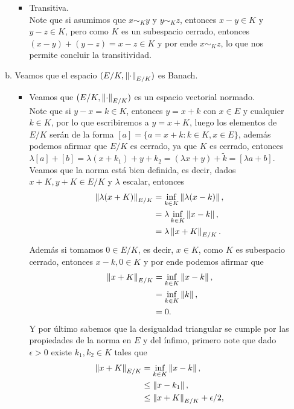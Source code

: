 \begin{homeworkProblem}
\begin{solution}
\begin{enumerate}[(i)]
\begin{enumerate}[(a)]
\begin{itemize}
            \item Transitiva.\\
              Note que si asumimos que $x\sim_{K}y$ y $y\sim_{K}z$, entonces $x-y\in K$ y $y-z\in K$, pero como $K$ es un subespacio cerrado, entonces $(x-y)+(y-z)=x-z\in K$ y por ende $x\sim_{K}z$, lo que nos permite concluir la transitividad.
          \end{itemize}
        \item Veamos que el espacio $(E/K,\left\|\cdot\right\|_{E/K})$ es Banach.
          \begin{itemize}
            \item Veamos que $(E/K,\left\|\cdot\right\|_{E/K})$ es un espacio vectorial normado.\\
              Note que si $y-x=k\in K$, entonces $y=x+k$ con $x\in E$ y cualquier $k\in K$, por lo que escribiremos a $y=x+K$, luego los elementos de $E/K$ serán de la forma $[a]=\{a=x+k:k\in K, x\in E\}$, además podemos afirmar que $E/K$ es cerrado, ya que $K$ es cerrado, entonces $\lambda[a]+[b]=\lambda (x+k_1)+y+k_2=(\lambda x+y)+\tilde{k}=[\lambda a+b]$. 
              Veamos que la norma está bien definida, es decir, dados $x+K,y+K\in E/K$ y $\lambda$ escalar, entonces
              \begin{align*}
                \left\|\lambda(x+K)\right\|_{E/K}&=\inf_{k\in K}\left\|\lambda(x-k)\right\|,\\
                &=\lambda\inf_{k\in K}\left\|x-k\right\|,\\
                &=\lambda \left\|x+K\right\|_{E/K}.
              \end{align*}
              Además si tomamos $0\in E/K$, es decir, $x\in K$, como $K$ es subespacio cerrado, entonces $x-k,0\in K$ y por ende podemos afirmar que
              \begin{align*}
                \left\|x+K\right\|_{E/K}&=\inf_{k\in K}\left\|x-k\right\|,\\
                &=\inf_{k\in K}\left\|k\right\|,\\
                &= 0.
              \end{align*}
              Y por último sabemos que la desigualdad triangular se cumple por las propiedades de la norma en $E$ y del ínfimo, primero note que dado $\epsilon>0$ existe $k_1,k_2\in K$ tales que
              \begin{align*}
                \norm{x+K}_{E/K}&=\inf_{k\in K}\norm{x-k},\\
                &\leq \norm{x-k_1},\\
                &\leq \norm{x+K}_{E/K}+\epsilon/2,\\

\end{align*}
\end{itemize}
\end{enumerate}
\end{enumerate}
\end{solution}
\end{homeworkProblem}
